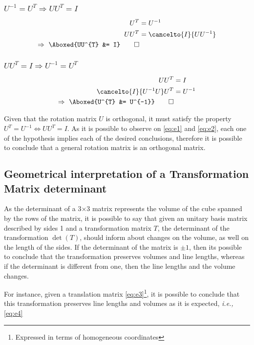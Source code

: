 \documentclass{article}
\begin{document}
\subsubsection*{$U^{-1} = U^{T} \Rightarrow UU^{T} = I$}
\begin{alignat}{2}
\nonumber
U^{T} &= U^{-1} \\
\nonumber
UU^{T} &= \cancelto{I}{UU^{-1}} \\
\Rightarrow ~ \Aboxed{UU^{T} &= I} \qed \label{eq:e1}
\end{alignat}

\subsubsection*{$UU^{T} = I \Rightarrow U^{-1} = U^{T}$}
\begin{alignat}{2}
\nonumber
UU^{T} &= I \\
\nonumber
\cancelto{I}{U^{-1}U}U^{T} &= U^{-1} \\
\Rightarrow ~ \Aboxed{U^{T} &= U^{-1}} \qed \label{eq:e2}
\end{alignat}

Given that the rotation matrix $U$ is orthogonal, it must satisfy the property $U^{T} = U^{-1} \Leftrightarrow UU^{T} = I$. As it is possible to observe on \eqref{eq:e1} and \eqref{eq:e2}, each one of the hypothesis implies each of the desired conclusions, therefore it is possible to conclude that a general rotation matrix is an orthogonal matrix. 

\subsection{Geometrical interpretation of a Transformation Matrix determinant}
As the determinant of a 3$\times$3  matrix represents the volume of the cube spanned by the rows of the matrix, it is possible to say that given an unitary basis matrix described by sides 1 and a transformation matrix $T$, the determinant of the transformation $\det{(T)}$, should inform about changes on the volume, as well on the length of the sides. If the determinant of the matrix is $\pm 1$, then its possible to conclude that the transformation preserves volumes and line lengths, whereas if the determinant is different from one, then the line lengths and the volume changes.

For instance, given a translation matrix \eqref{eq:e3}\footnote{Expressed in terms of homogeneous coordinates}, it is possible to conclude that this transformation preserves line lengths and volumes as it is expected, \textit{i.e.,} \eqref{eq:e4}
\end{document}
